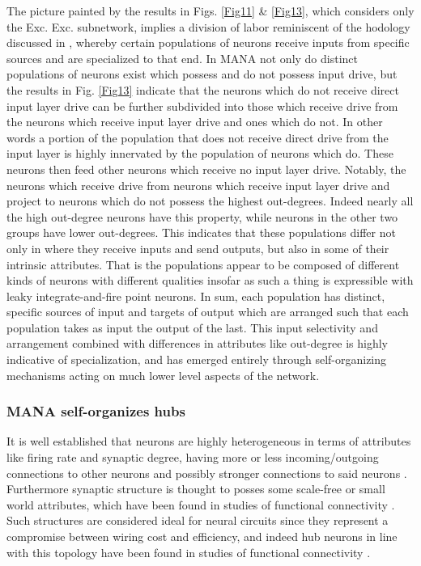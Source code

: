 \documentclass[10pt,letterpaper]{article}
\begin{document}
The picture painted by the results in Figs. \ref{Fig11} \& \ref{Fig13}, which considers only the Exc. \textrightarrow Exc. subnetwork, implies a division of labor reminiscent of the hodology discussed in \cite{harris2015neocortical}, whereby certain populations of neurons receive inputs from specific sources and are specialized to that end. In MANA not only do distinct populations of neurons exist which possess and do not possess input drive, but the results in Fig. \ref{Fig13} indicate that the neurons which do not receive direct input layer drive can be further subdivided into those which receive drive from the neurons which receive input layer drive and ones which do not. In other words a portion of the population that does not receive direct drive from the input layer is highly innervated by the population of neurons which do. These neurons then feed other neurons which receive no input layer drive. Notably, the neurons which receive drive from neurons which receive input layer drive and project to neurons which do not possess the highest out-degrees. Indeed nearly all the high out-degree neurons have this property, while neurons in the other two groups have lower out-degrees. This indicates that these populations differ not only in where they receive inputs and send outputs, but also in some of their intrinsic attributes. That is the populations appear to be composed of different kinds of neurons with different qualities insofar as such a thing is expressible with leaky integrate-and-fire point neurons. In sum, each population has distinct, specific sources of input and targets of output which are arranged such that each population takes as input the output of the last. This input selectivity and arrangement combined with differences in attributes like out-degree is highly indicative of specialization, and has emerged entirely through self-organizing mechanisms acting on much lower level aspects of the network.


\subsubsection*{MANA self-organizes hubs}
	
It is well established that neurons are highly heterogeneous in terms of attributes like firing rate and synaptic degree, having more or less incoming/outgoing connections to other neurons and possibly stronger connections to said neurons \cite{barth2004alteration, hromadka2008sparse, mizuseki2013preconfigured, buzsaki2014log, nigam2016, shimono2015functional, bonifazi2009gabaergic}. Furthermore synaptic structure is thought to posses some scale-free or small world attributes, which have been found in studies of functional connectivity \cite{nigam2016, shimono2015functional, bonifazi2009gabaergic}. Such structures are considered ideal for neural circuits since they represent a compromise between wiring cost and efficiency\cite{sporns2011networks, sporns2007identification}, and indeed hub neurons in line with this topology have been found in studies of functional connectivity \cite{nigam2016, shimono2015functional, sporns2007identification, bonifazi2009gabaergic}. 
	
\end{document}
